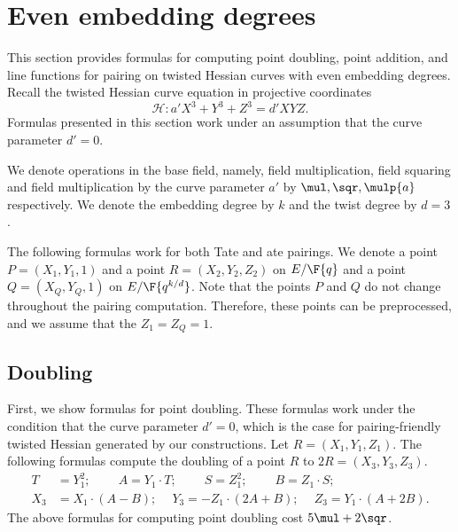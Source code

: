 \section{Even embedding degrees}
\label{sec:even}

This section provides formulas for computing point doubling, point addition,
and line functions for pairing on twisted Hessian curves with even embedding degrees.
Recall the twisted Hessian curve equation in projective coordinates
$$ \mathcal{H}: a' X^3 + Y^3 + Z^3 = d' X Y Z. $$
Formulas presented in this section work under an assumption that the curve parameter $d' = 0$.

We denote operations in the base field, namely, 
field multiplication, field squaring and field multiplication by the curve parameter $a'$
by $\mul, \sqr, \mulp{a}$ respectively.
We denote the embedding degree by $k$ and the twist degree by $d=3$.

The following formulas work for both Tate and ate pairings.
We denote a point $P = (X_1,Y_1,1)$ and a point $R = (X_2,Y_2,Z_2)$ on $E/\F{q}$
and a point $Q = (X_{Q},Y_{Q},1)$ on $E/\F{q^{k/d}}$. %
Note that the points $P$ and $Q$ do not change throughout the pairing computation.
Therefore, these points can be preprocessed, and we assume that the $Z_1 = Z_{Q} = 1$.


\subsection{Doubling}
First, we show formulas for point doubling.
These formulas work under the condition that the curve parameter $d'=0$,
which is the case for pairing-friendly twisted Hessian generated by our constructions.
Let $R = (X_1, Y_1, Z_1)$.
The following formulas compute the doubling of a point $R$ to $2R = (X_3,Y_3,Z_3)$.
\begin{align*}
T &= Y_1^2;\	\qquad	A = Y_1 \cdot T;\	\qquad
S = Z_1 ^ 2;\	\qquad	B = Z_1 \cdot S;\\
X_3 &= X_1 \cdot (A - B);\	\quad
Y_3 = -Z_1 \cdot (2A + B);\	\quad
Z_3 = Y_1 \cdot (A + 2B).
\end{align*}
The above formulas for computing point doubling
cost $5\mul + 2\sqr$. %

